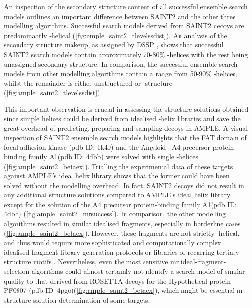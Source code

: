 An inspection of the secondary structure content of all successful ensemble search models outlines an important difference between SAINT2 and the other three modelling algorithms. Successful search models derived from SAINT2 decoys are predominantly \textalpha-helical (\cref{fig:ample_saint2_tlevelssdist}). An analysis of the secondary structure makeup, as assigned by DSSP \cite{Frishman1995-si}, shows that successful SAINT2 search models contain approximately 70-80\% \textalpha-helices with the rest being unassigned secondary structure. In comparison, the successful ensemble search models from other modelling algorithms contain a range from 50-90\% \textalpha-helices, whilst the remainder is either unstructured or \textbeta-structure (\cref{fig:ample_saint2_tlevelssdist}).

This important observation is crucial in assessing the structure solutions obtained since simple helices could be derived from idealised \textalpha-helix libraries and save the great overhead of predicting, preparing and sampling decoys in AMPLE. A visual inspection of SAINT2 ensemble search models highlights that the FAT domain of focal adhesion kinase (\gls{pdb} ID: 1k40) and the Amyloid-\textbeta\ A4 precursor protein-binding family A1(\gls{pdb} ID: 4dbb) were solved with single \textalpha-helices (\cref{fig:ample_saint2_betaex}). Trialling the experimental data of these targets against AMPLE's ideal helix library \cite{Thomas2015-wu} shows that the former could have been solved without the modelling overhead. In fact, SAINT2 decoys did not result in any additional structure solutions compared to AMPLE's ideal helix library except for the solution of the A4 precursor protein-binding family A1(\gls{pdb} ID: 4dbb) (\cref{fig:ample_saint2_mrsuccess}). In comparison, the other modelling algorithms resulted in similar idealised fragments, especially in borderline cases (\cref{fig:ample_saint2_betaex}). However, these fragments are not strictly \textalpha-helical, and thus would require more sophisticated and computationally complex idealised-fragment library generation protocols \cite[e.g.,][]{Jenkins2018-gf} or libraries of recurring tertiary structure motifs \cite[e.g.,][]{Sammito2013-ug}. Nevertheless, even the most sensitive \gls{mr} ideal-fragment-selection algorithms could almost certainly not identify a search model of similar quality to that derived from ROSETTA decoys for the Hypothetical protein PF0907 (\gls{pdb} ID: 4pgo)(\cref{fig:ample_saint2_betaex}), which might be essential in structure solution determination of some targets.

